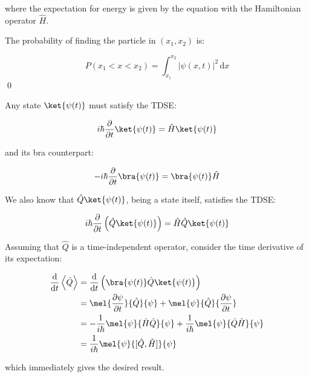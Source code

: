 \documentclass[12pt]{article}
\begin{document}
where the expectation for energy is given by the equation with the Hamiltonian operator $\hat{H}$.

The probability of finding the particle in $(x_{1}, x_{2})$ is:

\begin{equation}
    P(x_{1} < x < x_{2}) = \int_{x_{1}}^{x_{2}} \left| \psi(x,t) \right|^{2} \, \mathrm{d}x
\end{equation}
\qed


Any state $\ket{\psi(t)}$ must satisfy the TDSE:

\begin{equation}
    i\hbar \frac{\partial}{\partial t} \ket{\psi(t)} = \hat{H} \ket{\psi(t)}
\end{equation}

and its bra counterpart:

\begin{equation}
    -i\hbar \frac{\partial}{\partial t} \bra{\psi(t)} = \bra{\psi(t)} \hat{H}
\end{equation}

We also know that $\hat{Q} \ket{\psi(t)}$, being a state itself, satisfies the TDSE:

\begin{equation}
    i\hbar \frac{\partial}{\partial t} \left( \hat{Q} \ket{\psi(t)} \right) = \hat{H} \hat{Q} \ket{\psi(t)}
\end{equation}

Assuming that $\hat{Q}$ is a time-independent operator, consider the time derivative of its expectation:

\begin{equation}
    \begin{split}
        \frac{\mathrm{d}}{\mathrm{d}t} \left\langle \hat{Q} \right\rangle &= \frac{\mathrm{d}}{\mathrm{d}t} \left( \bra{\psi(t)} \hat{Q} \ket{\psi(t)} \right) \\
        &= \mel{\frac{\partial \psi}{\partial t}}{\hat{Q}}{\psi} + \mel{\psi}{\hat{Q}}{\frac{\partial \psi}{\partial t}} \\
        &= -\frac{1}{i\hbar} \mel{\psi}{\hat{H} \hat{Q}}{\psi} + \frac{1}{i\hbar} \mel{\psi}{\hat{Q} \hat{H}}{\psi} \\
        &= \frac{1}{i\hbar} \mel{\psi}{[\hat{Q}, \hat{H}]}{\psi}
    \end{split}
\end{equation}

which immediately gives the desired result.
\end{document}
